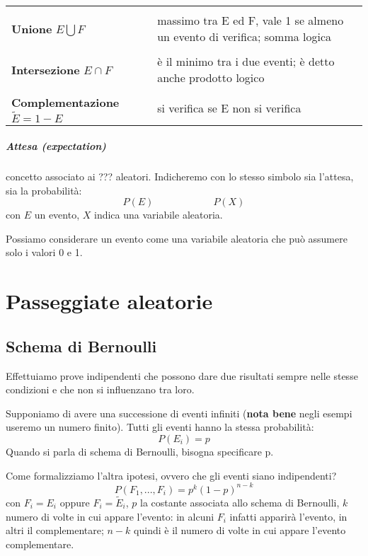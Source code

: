 \documentclass[a4paper,12pt]{book}
\begin{document}
\begin{center}
	\begin{tabular}{ p{4cm}|p{9cm} }	
		\hline
		\\
		\textbf{Unione} $ E \bigcup F $ & massimo tra E ed F, vale 1 se almeno un evento di verifica; somma logica \\
		\hline
		\\
		\textbf{Intersezione} $ E \cap F $ & è il minimo tra i due eventi; è detto anche prodotto logico \\
		\hline
		\\
		\textbf{Complementazione} $\widetilde{E} = 1 - E$ & si verifica se E non si verifica \\
		\hline
	\end{tabular}
\end{center}

\paragraph{Attesa (expectation)} concetto associato ai ??? aleatori.  
Indicheremo con lo stesso simbolo sia l'attesa, sia la probabilità: $$P(E) \qquad \qquad \qquad P(X)$$ con $E$ un evento, $ X $ indica una variabile aleatoria. 

Possiamo considerare un evento come una variabile aleatoria che può assumere solo i valori 0 e 1. 

\chapter{Passeggiate aleatorie}
\section{Schema di Bernoulli}
Effettuiamo prove indipendenti che possono dare due risultati sempre nelle stesse condizioni e che non si influenzano tra loro. 

Supponiamo di avere una successione di eventi infiniti (\textbf{nota bene} negli esempi useremo un numero finito).
Tutti gli eventi hanno la stessa probabilità:
$$P(E_i) = p$$
Quando si parla di schema di Bernoulli, bisogna specificare p.

Come formalizziamo l'altra ipotesi, ovvero che gli eventi siano indipendenti?
$$P (F_1, ..., F_i ) = p^k(1-p)^{n-k}$$
con $ F_i = E_i $ oppure $ F_i = \widetilde{E}_i $, $ p $ la costante associata allo schema di Bernoulli, $ k $ numero di volte in cui appare l'evento: in alcuni $ F_i $ infatti apparirà l'evento, in altri il complementare; $ n-k $ quindi è il numero di volte in cui appare l'evento complementare.
\end{document}

